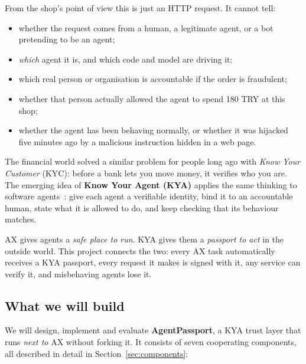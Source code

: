 From the shop's point of view this is just an HTTP request. It cannot tell:

\begin{itemize}
  \item whether the request comes from a human, a legitimate agent, or a bot pretending to be an agent;
  \item \emph{which} agent it is, and which code and model are driving it;
  \item which real person or organisation is accountable if the order is fraudulent;
  \item whether that person actually allowed the agent to spend 180 TRY at this shop;
  \item whether the agent has been behaving normally, or whether it was hijacked five minutes ago by a malicious instruction hidden in a web page.
\end{itemize}

The financial world solved a similar problem for people long ago with \emph{Know Your Customer} (KYC): before a bank lets you move money, it verifies who you are. The emerging idea of \textbf{Know Your Agent (KYA)} applies the same thinking to software agents~\cite{sumsub-kya,entrust-kya,vouched-kya}: give each agent a verifiable identity, bind it to an accountable human, state what it is allowed to do, and keep checking that its behaviour matches.

\begin{keyidea}
AX gives agents a \emph{safe place to run}. KYA gives them a \emph{passport to act} in the outside world. This project connects the two: every AX task automatically receives a KYA passport, every request it makes is signed with it, any service can verify it, and misbehaving agents lose it.
\end{keyidea}

\subsection{What we will build}

We will design, implement and evaluate \textbf{AgentPassport}, a KYA trust layer that runs \emph{next to} AX without forking it. It consists of seven cooperating components, all described in detail in Section~\ref{sec:components}:

